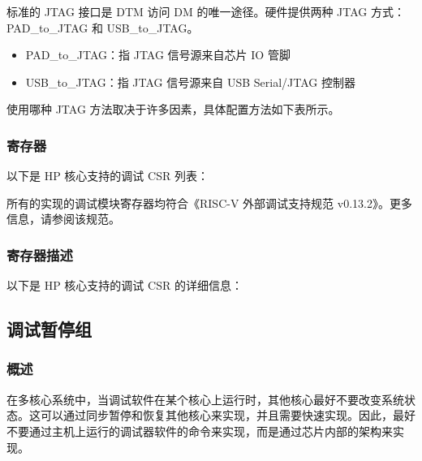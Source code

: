\documentclass[main\_\_CN.tex]{subfiles}
\begin{document}
标准的 JTAG 接口是 DTM 访问 DM 的唯一途径。硬件提供两种 JTAG 方式：PAD\_to\_JTAG 和 USB\_to\_JTAG。

\begin{itemize}
    \item {PAD\_to\_JTAG：指 JTAG 信号源来自芯片 IO 管脚}
    \item {USB\_to\_JTAG：指 JTAG 信号源来自 USB Serial/JTAG 控制器}
\end{itemize}

使用哪种 JTAG 方法取决于许多因素，具体配置方法如下表所示。






\hypertarget{riscvcpu-dbg-reg-summ}{}
\subsubsection{寄存器}
\label{sec:riscvcpu-dbg-reg-summ}

以下是 HP 核心支持的调试 CSR 列表：


所有的实现的调试模块寄存器均符合《RISC-V 外部调试支持规范 v0.13.2》。更多信息，请参阅该规范。



\subsubsection{寄存器描述}
以下是 HP 核心支持的调试 CSR 的详细信息：




\newpage
\subsection{调试暂停组}
\label{sec:riscvcpu-cti}
\subsubsection{概述}
\label{sec:riscvcpu-cti-overview}
在多核心系统中，当调试软件在某个核心上运行时，其他核心最好不要改变系统状态。这可以通过同步暂停和恢复其他核心来实现，并且需要快速实现。因此，最好不要通过主机上运行的调试器软件的命令来实现，而是通过芯片内部的架构来实现。
\end{document}
